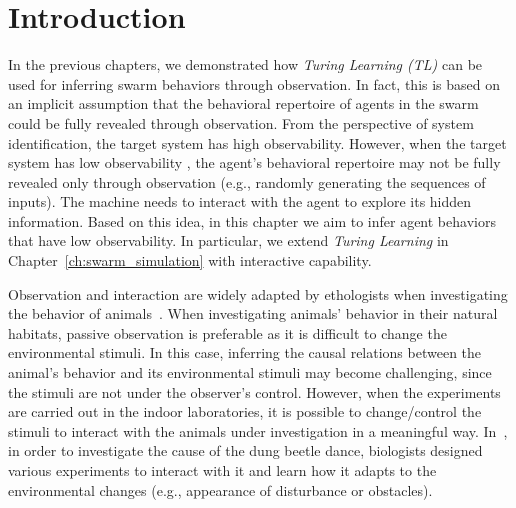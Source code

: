 \section{Introduction}\label{sec:introduction_interaction}

In the previous chapters, we demonstrated how \textit{Turing Learning (TL)} can be used for inferring swarm behaviors through observation. In fact, this is based on an implicit assumption that the behavioral repertoire of agents in the swarm could be fully revealed through observation. From the perspective of system identification, the target system has high observability. However, when the target system has low observability \cite{bongard2005active}, the agent's behavioral repertoire may not be fully revealed only through observation (e.g., randomly generating the sequences of inputs). The machine needs to interact with the agent to explore its hidden information. Based on this idea, in this chapter we aim to infer agent behaviors that have low observability. In particular, we extend \textit{Turing Learning} in Chapter~\ref{ch:swarm_simulation} with interactive capability. 

Observation and interaction are widely adapted by ethologists when investigating the behavior of animals~\cite{Martin_1983, Dacke2004, Emily2012}. When investigating animals' behavior in their natural habitats, passive observation is preferable as it is difficult to change the environmental stimuli. In this case, inferring the causal relations between the animal's behavior and its environmental stimuli may become challenging, since the stimuli are not under the observer's control. However, when the experiments are carried out in the indoor laboratories, it is possible to change/control the stimuli to interact with the animals under investigation in a meaningful way. In~\cite{Emily2012}, in order to investigate the cause of the dung beetle dance, biologists designed various experiments to interact with it and learn how it adapts to the environmental changes (e.g., appearance of disturbance or obstacles).

